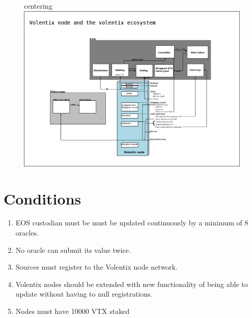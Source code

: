 \documentclass[]{article}
\begin{document}
\begin{figure}
	centering
	\includegraphics[scale=0.2]{vltxnode.png}
	\caption{}
	\label{fig:whitebackground-ecosystem02}
\end{figure}

\section{Conditions}
\begin{enumerate}
	\item EOS custodian must be  must be updated continuously by a minimum of 8 oracles.
	\item No oracle can submit its value twice. 
	\item Sources must register to the Volentix node network.
	\item Volentix nodes should be extended with new functionality of being able to update  without having to null registrations.
	\item Nodes must have 10000 VTX staked 	

\end{enumerate}
\end{document}
